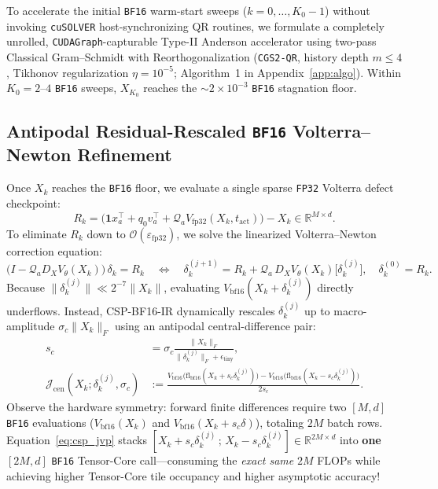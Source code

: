 \documentclass[11pt,a4paper]{article}
\theoremstyle{definition}
\theoremstyle{remark}
\newcommand{\bfsixteen}{\texttt{BF16}}
\newcommand{\fpthirtytwo}{\texttt{FP32}}
\newcommand{\epsfp}{\varepsilon_{\mathrm{fp32}}}
\begin{document}
To accelerate the initial \bfsixteen{} warm-start sweeps ($k=0,\dots,K_0-1$) without invoking \texttt{cuSOLVER} host-synchronizing QR routines, we formulate a completely unrolled, \texttt{CUDAGraph}-capturable Type-II Anderson accelerator \citep{walker2011anderson} using two-pass Classical Gram--Schmidt with Reorthogonalization (\texttt{CGS2-QR}, history depth $m \le 4$, Tikhonov regularization $\eta = 10^{-5}$; Algorithm~1 in Appendix~\ref{app:algo}). Within $K_0 = 2$--$4$ \bfsixteen{} sweeps, $X_{K_0}$ reaches the $\sim 2 \times 10^{-3}$ \bfsixteen{} stagnation floor.

\subsection{Antipodal Residual-Rescaled \bfsixteen{} Volterra--Newton Refinement}
Once $X_k$ reaches the \bfsixteen{} floor, we evaluate a single sparse \fpthirtytwo{} Volterra defect checkpoint:
\begin{equation}
\label{eq:defect}
    R_k = \big(\mathbf{1} x_a^\top + q_0 v_a^\top + \mathcal{Q}_a V_{\mathrm{fp32}}(X_k, t_{\mathrm{act}})\big) - X_k \in \mathbb{R}^{M \times d}.
\end{equation}
To eliminate $R_k$ down to $\mathcal{O}(\epsfp)$, we solve the linearized Volterra--Newton correction equation:
\begin{equation}
\label{eq:newton}
    \big(I - \mathcal{Q}_a D_X V_\theta(X_k)\big)\,\delta_k = R_k \quad \Longleftrightarrow \quad \delta_k^{(j+1)} = R_k + \mathcal{Q}_a \, D_X V_\theta(X_k)\big[\delta_k^{(j)}\big], \quad \delta_k^{(0)} = R_k.
\end{equation}
Because $\|\delta_k^{(j)}\| \ll 2^{-7}\|X_k\|$, evaluating $V_{\mathrm{bf16}}(X_k + \delta_k^{(j)})$ directly underflows. Instead, \textsc{CSP-BF16-IR} dynamically rescales $\delta_k^{(j)}$ up to macro-amplitude $\sigma_c \|X_k\|_F$ using an antipodal central-difference pair:
\begin{equation}
\label{eq:csp_jvp}
\begin{aligned}
    s_c &= \sigma_c \frac{\|X_k\|_F}{\|\delta_k^{(j)}\|_F + \epsilon_{\mathrm{tiny}}}, \\
    \mathcal{J}_{\mathrm{cen}}(X_k; \delta_k^{(j)}, \sigma_c) &:= \frac{V_{\mathrm{bf16}}\big(\mathrm{fl}_{\mathrm{bf16}}(X_k + s_c \delta_k^{(j)})\big) - V_{\mathrm{bf16}}\big(\mathrm{fl}_{\mathrm{bf16}}(X_k - s_c \delta_k^{(j)})\big)}{2 s_c}.
\end{aligned}
\end{equation}
Observe the hardware symmetry: forward finite differences require two $[M, d]$ \bfsixteen{} evaluations ($V_{\mathrm{bf16}}(X_k)$ and $V_{\mathrm{bf16}}(X_k + s_c \delta)$), totaling $2M$ batch rows. Equation~\eqref{eq:csp_jvp} stacks $[X_k + s_c \delta_k^{(j)} \,;\, X_k - s_c \delta_k^{(j)}] \in \mathbb{R}^{2M \times d}$ into \textbf{one} $[2M, d]$ \bfsixteen{} Tensor-Core call---consuming the \emph{exact same} $2M$ FLOPs while achieving higher Tensor-Core tile occupancy and higher asymptotic accuracy!
\end{document}
